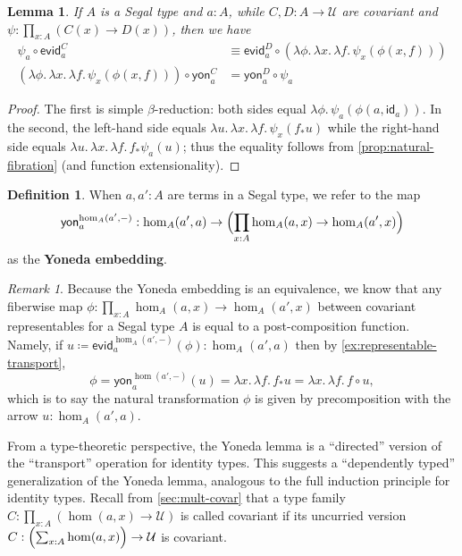 \documentclass[12pt]{amsart}
\theoremstyle{plain}
\newtheorem{lem}[thm]{Lemma}
\theoremstyle{definition}
\newtheorem{defn}[thm]{Definition}
\theoremstyle{remark}
\newtheorem{rmk}[thm]{Remark}
\numberwithin{equation}{section}
\newcommand{\jdeq}{\equiv}
\newcommand{\defeq}{\coloneqq}
\newcommand{\univtype}{\mathcal{U}}
\newcommand{\evid}{\mathsf{evid}}
\newcommand{\yon}{\mathsf{yon}}
\newcommand{\lam}[1]{\lambda #1.\,}
\newcommand{\idarr}[1]{\mathsf{id}_{#1}}
\newcommand{\covtr}[1]{{#1}_*}  %
\newcommand{\Parens}[1]{\Bigl(#1\Bigr)}
\begin{document}
\begin{lem}\label{thm:yoneda-nat}
  If $A$ is a Segal type and $a:A$, while $C,D:A\to\univtype$ are covariant and $\psi:\prod_{x:A} (C(x) \to D(x))$, then we have
  \begin{align*}
    \psi_a \circ \evid^C_a &\jdeq \evid^D_a \circ (\lam{\phi}\lam{x}\lam{f} \psi_x(\phi(x,f)))\\
    (\lam{\phi}\lam{x}\lam{f} \psi_x(\phi(x,f))) \circ \yon^C_a &= \yon^D_a \circ \psi_a
  \end{align*}
\end{lem}
\begin{proof}
  The first is simple $\beta$-reduction: both sides equal $\lam{\phi} \psi_a(\phi(a,\idarr a))$.
  In the second, the left-hand side equals $\lam u \lam x \lam f \psi_x(\covtr f u)$ while the right-hand side equals $\lam u \lam x \lam f \covtr f \psi_a(u)$; thus the equality follows from \cref{prop:natural-fibration} (and function extensionality).
\end{proof}


\begin{defn}\label{defn:yoneda-embedding}
When $a,a':A$ are terms in a Segal type, we refer to the map
\[   \yon^{\hom_A(a',-)}_a  :  \hom_A(a',a) \to \Parens{\prod_{x:A} \hom_A(a,x) \to \hom_A(a',x)}\]
as the \textbf{Yoneda embedding}. 
\end{defn}

\begin{rmk}\label{rmk:rep-nat-trans} Because the Yoneda embedding is an equivalence, we know that any fiberwise map $\phi : \prod_{x:A} \hom_A(a,x) \to \hom_A(a',x)$ between covariant representables for a Segal type $A$ is equal to a post-composition function. Namely, if $u \defeq \evid_a^{\hom_A(a',-)}(\phi) : \hom_A(a',a)$ then by \cref{ex:representable-transport}, 
\[\phi = \yon_a^{\hom(a',-)}(u) = \lam{x}\lam{f} \covtr f u = \lam{x}\lam{f} f \circ u,\] which is to say the natural transformation $\phi$ is given by precomposition with the arrow $u : \hom_A(a',a)$.
\end{rmk}

From a type-theoretic perspective, the Yoneda lemma is a ``directed'' version of the ``transport'' operation for identity types.
This suggests a ``dependently typed'' generalization of the Yoneda lemma, analogous to the full induction principle for identity types.
Recall from \cref{sec:mult-covar} that a type family $C:\prod_{x:A} (\hom(a,x)\to \univtype)$ is called covariant if its uncurried version $C:\Parens{\sum_{x:A} \hom(a,x)} \to \univtype$ is covariant.
\end{document}

